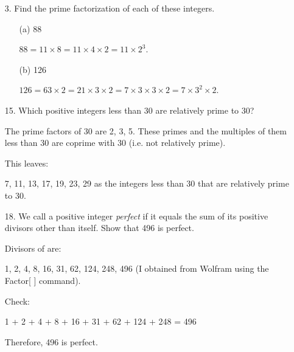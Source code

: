 \documentclass[12pt]{article}
\newcommand\bufsub{\vspace{1.0in}}
\newenvironment{answer}{\larger[2]}{}
\begin{document}
\begin{enumerate}
\item[3.] Find the prime factorization of each of these integers.

\begin{enumerate}
    \item[(a)] 88
    
    \begin{answer}
        $88 = 11 \times 8 = 11 \times 4 \times 2 = 11 \times 2^3$.
    \end{answer}
    
    \vspace{0.2in}

    \item[(b)] 126
    
    \begin{answer}
        $126 = 63 \times 2 = 21 \times 3 \times 2 = 7 \times 3 \times 3 \times 2 = 7 \times 3^2 \times 2$.
    \end{answer}
    
\end{enumerate}
\bufsub


\item[15.] Which positive integers less than 30 are relatively prime to 30?

\begin{answer}
    The prime factors of 30 are 2, 3, 5. These primes and the multiples of them less than 30 are coprime with 30 (i.e. not relatively prime).

    This leaves:

    7, 11, 13, 17, 19, 23, 29 as the integers less than 30 that are relatively prime to 30.
\end{answer}
\newpage


\item[18.] We call a positive integer \emph{perfect} if it equals the sum of its positive divisors other than itself. Show that 496 is perfect.

\begin{answer}
    Divisors of are:

    1, 2, 4, 8, 16, 31, 62, 124, 248, 496 (I obtained from Wolfram using the Factor[ ] command).

    Check:

    1 + 2 + 4 + 8 + 16 + 31 + 62 + 124 + 248 = 496

    Therefore, 496 is perfect.
\end{answer}
\bufsub


\end{enumerate}
\end{document}
